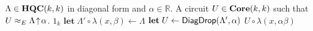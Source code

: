 \begin{algorithm}[t]
\caption{$\DiagDrop(\Lambda, \alpha)$}\label{Alg:DiagDrop}
\begin{algorithmic}
\Require $\Lambda \in \mathbf{HQC}( k, k )$ in diagonal form and $\alpha \in \mathbb{R}$.
\Ensure A circuit $U \in \mathbf{Core}( k, k )$ such that $U \approx_E \Lambda \!\uparrow\! \alpha$.
        \Return $1_k$
    \EndIf
    \State $\textbf{let} \; \Lambda' \circ \lambda( x, \beta ) \gets \Lambda$
    \State $\textbf{let} \; U \gets \mathsf{DiagDrop}( \Lambda', \alpha )$
    \State \Return $U \circ \lambda( x, \alpha\beta )$
\end{algorithmic}
\end{algorithm}
